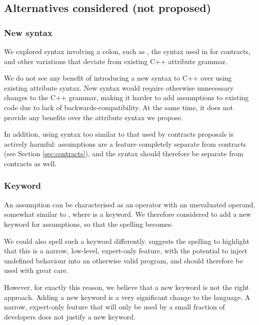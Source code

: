\subsection{Alternatives considered (not proposed)}

\subsubsection{New syntax}

We explored syntax involving a colon, such as , the syntax used in \cite{P0542R5} for contracts, and other variations that deviate from existing C++ attribute grammar. 

We do not see any benefit of introducing a new syntax to C++ over using existing attribute syntax. New syntax would require otherwise unnecessary changes to the C++ grammar, making it harder to add assumptions to existing code due to lack of backwards-compatibility. At the same time, it does not provide any benefits over the attribute syntax we propose.

In addition, using syntax too similar to that used by contracts proposals is actively harmful: assumptions are a feature completely separate from contracts (see Section \ref{sec:contracts}), and the syntax should therefore be separate from contracts as well.

\subsubsection{Keyword}

An assumption can be characterised as an operator with an unevaluated operand, somewhat similar to , where  is a keyword. We therefore considered to add a new keyword for assumptions, so that the spelling becomes:

\forceindent
{}

We could also spell such a keyword differently. \cite{P2064R0} suggests the spelling  to highlight that this is a narrow, low-level, expert-only feature, with the potential to inject undefined behaviour into an otherwise valid program, and should therefore be used with great care.

However, for exactly this reason, we believe that a new keyword is not the right approach. Adding a new keyword is a very significant change to the language. A narrow, expert-only feature that will only be used by a small fraction of developers does not justify a new keyword.

